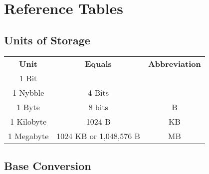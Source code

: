 \chapter{Reference Tables}\label{ch:referencetables}

\section{Units of Storage}\label{s:unitsofstorage}

\begin{center}
	\begin{tabular}{|c|c|c|}
		\hline
		\textbf{Unit} & \textbf{Equals} & \textbf{Abbreviation} \\ \hhline{|=|=|=|}
		1 Bit & & \\ \hline
		1 Nybble & 4 Bits & \\ \hline
		1  Byte & 8 bits & B  \\ \hline
		1  Kilobyte & 1024 B & KB \\ \hline
		1  Megabyte & 1024 KB or 1,048,576 B & MB \\ \hline
	\end{tabular}
\end{center}

\clearpage

\section{Base Conversion}\label{s:baseconversion}

\small

